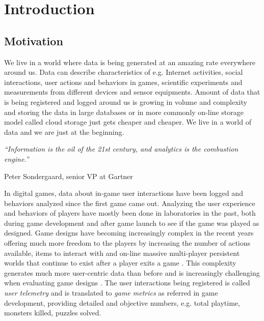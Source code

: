
\chapter{Introduction} %
\label{Chapter1}

\section{Motivation}
We live in a world where data is being generated at an amazing rate everywhere around us. Data can describe characteristics of e.g. Internet activities, social interactions, user actions and behaviors in games, scientific experiments and measurements from different devices and sensor equipments. Amount of data that is being registered and logged around us is growing in volume and complexity and storing the data in large databases or in more commonly on-line storage model called cloud storage just gets cheaper and cheaper. We live in a world of data and we are just at the beginning. 

\null
\textit{``Information is the oil of the 21st century, and analytics is the combustion engine.''}

\begin{flushright}
Peter Sondergaard, senior VP at Gartner
\end{flushright}

In digital games, data about in-game user interactions have been logged and behaviors analyzed since the first game came out. Analyzing the user experience and behaviors of players have mostly been done in laboratories in the past, both during game development and after game launch to see if the game was played as designed. Game designs have becoming increasingly complex in the recent years offering much more freedom to the players by increasing the number of actions available, items to interact with and on-line massive multi-player persistent worlds that continue to exist after a player exits a game \citep{Kim:2008Tracking, Drachen:2011Evaluating}. This complexity generates much more user-centric data than before and is increasingly challenging when evaluating game designs \cite{Pagulayan:2002UserDesign, Seif:2013GameAnalytics}. The user interactions being registered is called \textit{user telemetry} and is translated to \textit{game metrics} as referred in game development, providing detailed and objective numbers, e.g. total playtime, monsters killed, puzzles solved.

